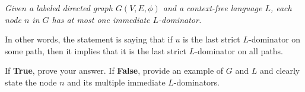 \documentclass[12pt]{article}
\begin{document}
\begin{enumerate}
      \emph{Given a labeled directed graph $G(V,E, \phi)$ and a context-free
      language $L$, each node $n$ in $G$ has at most one immediate $L$-dominator.}

      In other words, the statement is saying that if $u$ is the last strict
      $L$-dominator on some path, then it implies that it is the last strict
      $L$-dominator on all paths. 
    
      If \textbf{True}, prove your answer. If \textbf{False}, provide an example
      of $G$ and $L$ and clearly state the node $n$ and its multiple immediate
      $L$-dominators.
      \begin{mdframed}
      \vspace{3em}
      \end{mdframed}
      
  \end{enumerate}
    
\end{document}
